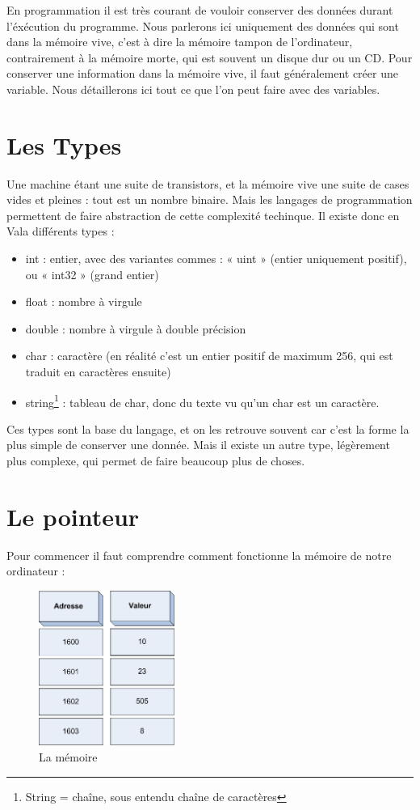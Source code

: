 En programmation il est très courant de vouloir conserver des données durant l'éxécution du programme.
Nous parlerons ici uniquement des données qui sont dans la mémoire vive, c'est à dire la mémoire tampon 
de l'ordinateur, contrairement à la mémoire morte, qui est souvent un disque dur ou un CD.
Pour conserver une information dans la mémoire vive, il faut généralement créer une variable. Nous détaillerons 
ici tout ce que l'on peut faire avec des variables.

\section{Les Types}
Une machine étant une suite de transistors, et la mémoire vive une suite de cases vides et pleines :
tout est un nombre binaire. Mais les langages de programmation permettent de faire abstraction de cette complexité techinque.
Il existe donc en Vala différents types : 
\begin{itemize}
  \item int : entier, avec des variantes commes : « uint » (entier uniquement positif), ou « int32 » (grand entier)
  \item float : nombre à virgule 
  \item double : nombre à virgule à double précision
  \item char : caractère (en réalité c'est un entier positif de maximum 256, qui est traduit en caractères ensuite)
  \item string\footnote{String = chaîne, sous entendu chaîne de caractères} : tableau de char, donc du texte vu qu'un char est un caractère.
\end{itemize}

Ces types sont la base du langage, et on les retrouve souvent car c'est la forme la plus simple de conserver une donnée.
Mais il existe un autre type, légèrement plus complexe, qui permet de faire beaucoup plus de choses.

\section{Le pointeur}
Pour commencer il faut comprendre comment fonctionne la mémoire de notre ordinateur : 
\begin{figure}[H]
	\begin{center}
	  \includegraphics[width=12em]{Annexes/Images/tableau.png}
	\end{center}
	\caption{La mémoire}
\end{figure}

